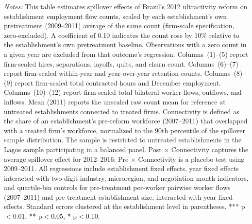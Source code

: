 \documentclass[12pt,letterpaper]{article}
\begin{document}
\begin{table}[]
\begin{threeparttable}
\begin{tablenotes}
\item \textit{Notes:} This table estimates spillover effects of Brazil's 2012 ultractivity reform on establishment employment flow counts, scaled by each establishment's own pretreatment (2009--2011) average of the same count (firm-scale specification, zero-excluded). A coefficient of 0.10 indicates the count rose by 10\% relative to the establishment's own pretreatment baseline. Observations with a zero count in a given year are excluded from that outcome's regression. Columns~(1)--(5) report firm-scaled hires, separations, layoffs, quits, and churn count. Columns~(6)--(7) report firm-scaled within-year and year-over-year retention counts. Columns~(8)--(9) report firm-scaled total contracted hours and December employment. Columns~(10)--(12) report firm-scaled total bilateral worker flows, outflows, and inflows. Mean (2011) reports the unscaled raw count mean for reference at untreated establishments connected to treated firms. Connectivity is defined as the share of an establishment's pre-reform workforce (2007--2011) that overlapped with a treated firm's workforce, normalized to the 90th percentile of the spillover sample distribution. The sample is restricted to untreated establishments in the Lagos sample participating in a balanced panel. Post $\times$ Connectivity captures the average spillover effect for 2012--2016; Pre $\times$ Connectivity is a placebo test using 2009--2011. All regressions include establishment fixed effects, year fixed effects interacted with two-digit industry, microregion, and negotiation-month indicators, and quartile-bin controls for pre-treatment per-worker pairwise worker flows (2007--2011) and pre-treatment establishment size, interacted with year fixed effects. Standard errors clustered at the establishment level in parentheses. *** p$<$0.01, ** p$<$0.05, * p$<$0.10.
\end{tablenotes}
\end{threeparttable}
\end{table}

\clearpage
\end{document}
